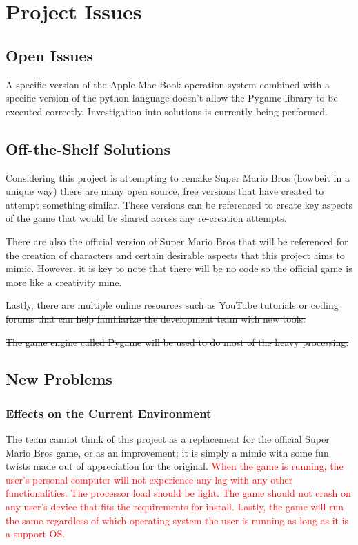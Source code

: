\documentclass[12pt, titlepage]{article}
\begin{document}
\section{Project Issues}

\subsection{Open Issues}
A specific version of the Apple Mac-Book operation system combined with a specific version of the python language doesn't allow the Pygame library to be executed correctly. Investigation into solutions is currently being performed.

\subsection{Off-the-Shelf Solutions}
Considering this project is attempting to remake Super Mario Bros (howbeit in a unique way) there are many open source, free versions that have created to attempt something similar. These versions can be referenced to create key aspects of the game that would be shared across any re-creation attempts.

There are also the official version of Super Mario Bros that will be referenced for the creation of characters and certain desirable aspects that this project aims to mimic. However, it is key to note that there will be no code so the official game is more like a creativity mine.

\sout{Lastly, there are multiple online resources such as YouTube tutorials or coding forums that can help familiarize the development team with new tools.}

\sout{The game engine called Pygame will be used to do most of the heavy processing.}

\subsection{New Problems}
\subsubsection{Effects on the Current Environment}
The team cannot think of this project as a replacement for the official Super Mario Bros game, or as an improvement; it is simply a mimic with some fun twists made out of appreciation for the original. \textcolor{red}{When the game is running, the user's personal computer will not experience any lag with any other functionalities. The processor load should be light. The game should not crash on any user's device that fits the requirements for install. Lastly, the game will run the same regardless of which operating system the user is running as long as it is a support OS.}
\end{document}

